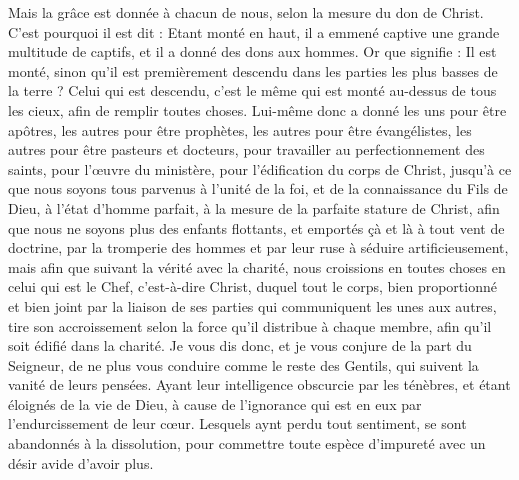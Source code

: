 \begin{multicols}{2}
Mais la grâce est donnée à chacun de nous, selon la mesure du don de Christ.
C'est pourquoi il est dit : Etant monté en haut, il a emmené captive une grande multitude de captifs, et il a donné des dons aux hommes.
Or que signifie : Il est monté, sinon qu'il est premièrement descendu dans les parties les plus basses de la terre ?
Celui qui est descendu, c'est le même qui est monté au-dessus de tous les cieux, afin de remplir toutes choses.
Lui-même donc a donné les uns pour être apôtres, les autres pour être prophètes, les autres pour être évangélistes, les autres pour être pasteurs et docteurs,
pour travailler au perfectionnement des saints, pour l'œuvre du ministère, pour l'édification du corps de Christ,
jusqu'à ce que nous soyons tous parvenus à l'unité de la foi, et de la connaissance du Fils de Dieu, à l'état d'homme parfait, à la mesure de la parfaite stature de Christ,
afin que nous ne soyons plus des enfants flottants, et emportés çà et là à tout vent de doctrine, par la tromperie des hommes et par leur ruse à séduire artificieusement,
mais afin que suivant la vérité avec la charité, nous croissions en toutes choses en celui qui est le Chef, c'est-à-dire Christ,
duquel tout le corps, bien proportionné et bien joint par la liaison de ses parties qui communiquent les unes aux autres, tire son accroissement selon la force qu'il distribue à chaque membre, afin qu'il soit édifié dans la charité.
Je vous dis donc, et je vous conjure de la part du Seigneur, de ne plus vous conduire comme le reste des Gentils, qui suivent la vanité de leurs pensées.
Ayant leur intelligence obscurcie par les ténèbres, et étant éloignés de la vie de Dieu, à cause de l'ignorance qui est en eux par l'endurcissement de leur cœur.
Lesquels aynt perdu tout sentiment, se sont abandonnés à la dissolution, pour commettre toute espèce d'impureté avec un désir avide d'avoir plus.

\end{multicols}
